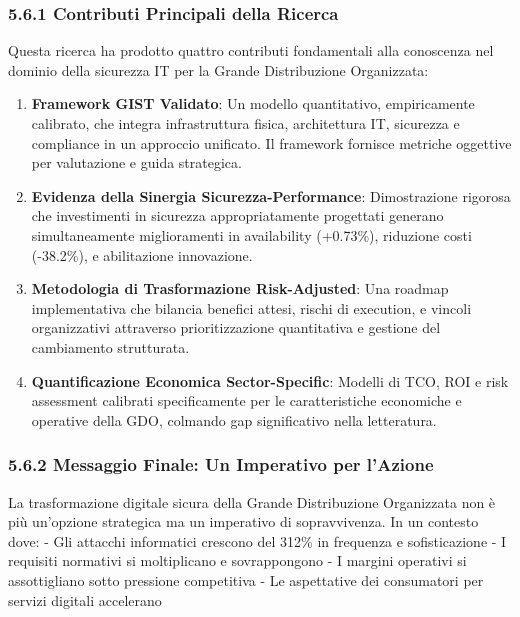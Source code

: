 \documentclass{report}
\begin{document}
\subsubsection{5.6.1 Contributi Principali della
Ricerca}\label{contributi-principali-della-ricerca}

Questa ricerca ha prodotto quattro contributi fondamentali alla
conoscenza nel dominio della sicurezza IT per la Grande Distribuzione
Organizzata:

\begin{enumerate}
\def\labelenumi{\arabic{enumi}.}
\item
  \textbf{Framework GIST Validato}: Un modello quantitativo,
  empiricamente calibrato, che integra infrastruttura fisica,
  architettura IT, sicurezza e compliance in un approccio unificato. Il
  framework fornisce metriche oggettive per valutazione e guida
  strategica.
\item
  \textbf{Evidenza della Sinergia Sicurezza-Performance}: Dimostrazione
  rigorosa che investimenti in sicurezza appropriatamente progettati
  generano simultaneamente miglioramenti in availability (+0.73\%),
  riduzione costi (-38.2\%), e abilitazione innovazione.
\item
  \textbf{Metodologia di Trasformazione Risk-Adjusted}: Una roadmap
  implementativa che bilancia benefici attesi, rischi di execution, e
  vincoli organizzativi attraverso prioritizzazione quantitativa e
  gestione del cambiamento strutturata.
\item
  \textbf{Quantificazione Economica Sector-Specific}: Modelli di TCO,
  ROI e risk assessment calibrati specificamente per le caratteristiche
  economiche e operative della GDO, colmando gap significativo nella
  letteratura.
\end{enumerate}

\subsubsection{5.6.2 Messaggio Finale: Un Imperativo per
l'Azione}\label{messaggio-finale-un-imperativo-per-lazione}

La trasformazione digitale sicura della Grande Distribuzione Organizzata
non è più un'opzione strategica ma un imperativo di sopravvivenza. In un
contesto dove: - Gli attacchi informatici crescono del 312\% in
frequenza e sofisticazione - I requisiti normativi si moltiplicano e
sovrappongono - I margini operativi si assottigliano sotto pressione
competitiva - Le aspettative dei consumatori per servizi digitali
accelerano
\end{document}
